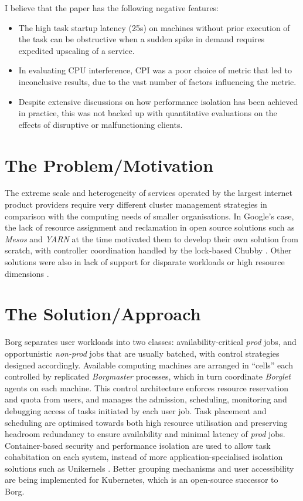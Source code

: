 \documentclass[11pt]{article}
\begin{document}
I believe that the paper has the following negative features:
\begin{itemize}
	\item The high task startup latency (25s) on machines without prior execution of the task can be obstructive when a sudden spike in demand requires expedited upscaling of a service.
	\item In evaluating CPU interference, CPI was a poor choice of metric that led to inconclusive results, due to the vast number of factors influencing the metric.
	\item Despite extensive discussions on how performance isolation has been achieved in practice, this was not backed up with quantitative evaluations on the effects of disruptive or malfunctioning clients. 
\end{itemize}

\section*{The Problem/Motivation}

The extreme scale and heterogeneity of services \cite[\S 7]{verma2015large} operated by the largest internet product providers require very different cluster management strategies in comparison with the computing needs of smaller organisations. In Google's case, the lack of resource assignment and reclamation in open source solutions such as \emph{Mesos} \cite{hindman2011mesos} and \emph{YARN} \cite{vavilapalli2013apache} at the time motivated them to develop their own solution from scratch, with controller coordination handled by the lock-based Chubby \cite{burrows2006chubby}. Other solutions were also in lack of support for disparate workloads \cite{schwarzkopf2013omega} or high resource dimensions \cite{boutin2014apollo}.

\section*{The Solution/Approach}

Borg separates user workloads into two classes: availability-critical \emph{prod} jobs, and opportunistic \emph{non-prod} jobs that are usually batched, with control strategies designed accordingly. Available computing machines are arranged in ``cells'' each controlled by replicated \emph{Borgmaster} processes, which in turn coordinate \emph{Borglet} agents on each machine. This control architecture enforces resource reservation and quota from users, and manages the admission, scheduling, monitoring and debugging access of tasks initiated by each user job. Task placement and scheduling are optimised towards both high resource utilisation and preserving headroom redundancy to ensure availability and minimal latency of \emph{prod} jobs. Container-based security and performance isolation are used to allow task cohabitation on each system, instead of more application-specialised isolation solutions such as Unikernels \cite{madhavapeddy2013unikernels}. Better grouping mechanisms and user accessibility are being implemented for Kubernetes, which is an open-source successor to Borg.
\end{document}
